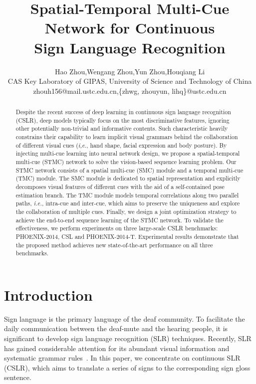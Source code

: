 \documentclass[letterpaper]{article} %
\title{Spatial-Temporal Multi-Cue Network for Continuous \\ Sign Language Recognition}
\author{Hao Zhou,\quad Wengang Zhou,\quad Yun Zhou,\quad Houqiang Li\\
CAS Key Laboratory of GIPAS, University of Science and Technology of China \\
zhouh156@mail.ustc.edu.cn,\quad \{zhwg, zhouyun, lihq\}@ustc.edu.cn\\
}
\begin{document}
\maketitle

\begin{abstract}
Despite the recent success of deep learning in continuous sign language recognition (CSLR), deep models typically focus on the most discriminative features, ignoring other potentially non-trivial and informative contents. 
Such characteristic heavily constrains their capability to learn implicit visual grammars behind the collaboration of different visual cues (\emph{i,e.}, hand shape, facial expression and body posture). 
By injecting multi-cue learning into neural network design, 
we propose a spatial-temporal multi-cue (STMC) network to solve the vision-based sequence learning problem. 
Our STMC network consists of a spatial multi-cue (SMC) module and a temporal multi-cue (TMC) module. 
The SMC module is dedicated to spatial representation and explicitly decomposes visual features of different cues with the aid of a self-contained pose estimation branch. 
The TMC module models temporal correlations along two parallel paths, \emph{i.e.}, intra-cue and inter-cue, 
which aims to preserve the uniqueness and explore the collaboration of multiple cues. 
Finally, we design a joint optimization strategy to achieve the end-to-end sequence learning of the STMC network. 
To validate the effectiveness,  
we perform experiments on three large-scale CSLR benchmarks:
PHOENIX-2014, CSL and PHOENIX-2014-T. 
Experimental results demonstrate that the proposed method achieves new state-of-the-art performance on all three benchmarks.
\end{abstract}

\section{Introduction}
Sign language is the primary language of the deaf community. 
To facilitate the daily communication between the deaf-mute and the hearing people, it is significant to develop sign language recognition (SLR) techniques. 
Recently, SLR has gained considerable attention for its abundant visual information and systematic grammar rules~\cite{staged,han,tpami19,ian,aaai2019skeleton}. 
In this paper, we concentrate on continuous SLR (CSLR), which aims to translate a series of signs to the corresponding sign gloss sentence.
\end{document}
